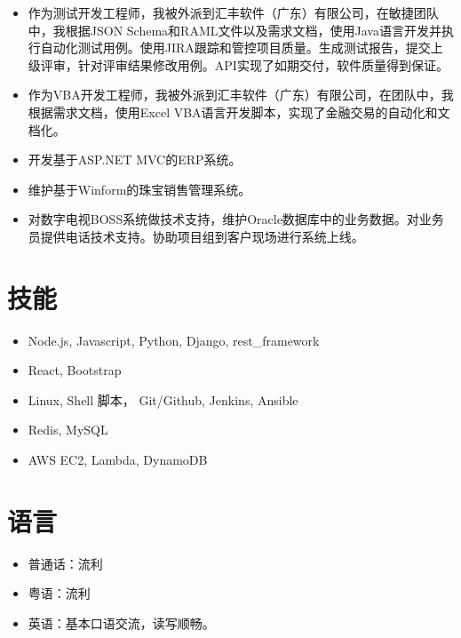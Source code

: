 \documentclass{resume}
\begin{document}
\begin{itemize}[parsep=0.5ex]
  \item 作为测试开发工程师，我被外派到汇丰软件（广东）有限公司，在敏捷团队中，我根据JSON Schema和RAML文件以及需求文档，使用Java语言开发并执行自动化测试用例。使用JIRA跟踪和管控项目质量。生成测试报告，提交上级评审，针对评审结果修改用例。API实现了如期交付，软件质量得到保证。
\end{itemize}

\begin{itemize}[parsep=0.5ex]
  \item 作为VBA开发工程师，我被外派到汇丰软件（广东）有限公司，在团队中，我根据需求文档，使用Excel VBA语言开发脚本，实现了金融交易的自动化和文档化。
\end{itemize}

\begin{itemize}[parsep=0.5ex]
  \item 开发基于ASP.NET MVC的ERP系统。
  \item 维护基于Winform的珠宝销售管理系统。
\end{itemize}

\begin{itemize}[parsep=0.5ex]
  \item 对数字电视BOSS系统做技术支持，维护Oracle数据库中的业务数据。对业务员提供电话技术支持。协助项目组到客户现场进行系统上线。
\end{itemize}


\section{技能}

\begin{itemize}[parsep=0.5ex]
  \item Node.js, Javascript, Python, Django, rest\_framework
  \item React, Bootstrap
  \item Linux, Shell 脚本， Git/Github, Jenkins, Ansible
  \item Redis, MySQL
  \item AWS EC2, Lambda, DynamoDB
\end{itemize}


\section{语言}

\begin{itemize}[parsep=0.5ex]
  \item 普通话：流利
  \item 粤语：流利
  \item 英语：基本口语交流，读写顺畅。
\end{itemize}
\end{document}

